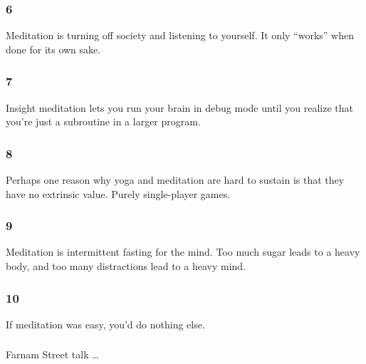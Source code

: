 \begin{frame}[fragile]\frametitle{6}
\begin{center}
Meditation is turning off society and listening to yourself. It only “works” when done for its own sake.\end{center}
\end{frame}

\begin{frame}[fragile]\frametitle{7}
\begin{center}
Insight meditation lets you run your brain in debug mode until you realize that you're just a subroutine in a larger program.
\end{center}
\end{frame}

\begin{frame}[fragile]\frametitle{8}
\begin{center}
Perhaps one reason why yoga and meditation are hard to sustain is that they have no extrinsic value. Purely single-player games.
\end{center}
\end{frame}

\begin{frame}[fragile]\frametitle{9}
\begin{center}
Meditation is intermittent fasting for the mind. Too much sugar leads to a heavy body, and too many distractions lead to a heavy mind.
\end{center}
\end{frame}


\begin{frame}[fragile]\frametitle{10}
\begin{center}
If meditation was easy, you’d do nothing else.
\end{center}
\end{frame}



\begin{frame}[fragile]\frametitle{}
\begin{center}
{\Large Farnam Street talk \ldots }

\end{center}
\end{frame}

